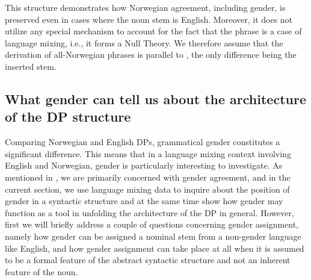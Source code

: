 \documentclass[output=paper]{langscibook}
\begin{document}
This structure demonstrates how Norwegian agreement, including gender, is preserved even in cases where the noun stem is English. Moreover, it does not utilize any special mechanism to account for the fact that the phrase is a case of language mixing, i.e., it forms a Null Theory. We therefore assume that the derivation of all-Norwegian phrases is parallel to , the only difference being the inserted stem. 


\subsection{What gender can tell us about the architecture of the DP structure}\label{sec:riksem:4.2}

Comparing Norwegian and English DPs, grammatical gender constitutes a significant difference. This means that in a language mixing context involving English and Norwegian, gender is particularly interesting to investigate. As mentioned in , we are primarily concerned with gender agreement, and in the current section, we use language mixing data to inquire about the position of gender in a syntactic structure and at the same time show how gender may function as a tool in unfolding the architecture of the DP in general. However, first we will briefly address a couple of questions concerning gender assignment, namely how gender can be assigned a nominal stem from a non-gender language like English, and how gender assignment can take place at all when it is assumed to be a formal feature of the abstract syntactic structure and not an inherent feature of the noun.  
\end{document}
